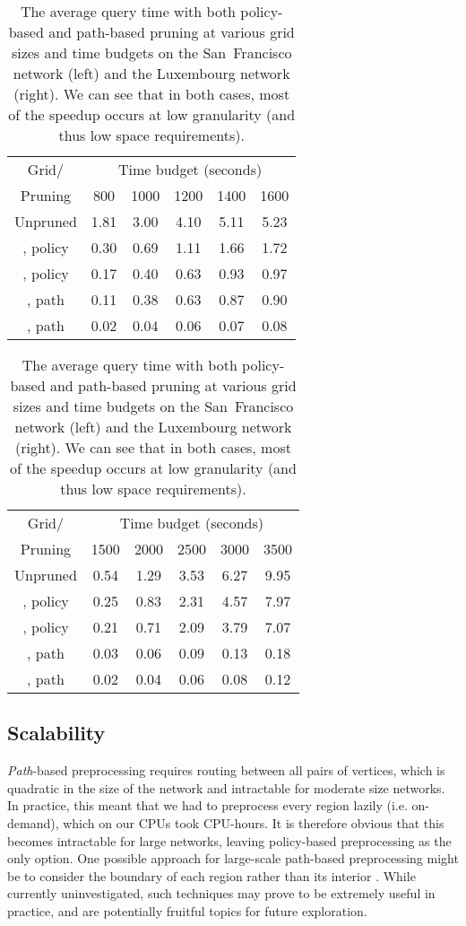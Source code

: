 \documentclass[oribibl]{llncs}
\begin{document}
			\begin{table}[H]
				\centering
				\caption
				{
					The average query time with both policy-based and path-based pruning
					at various grid sizes and time budgets on the San~Francisco network (left)
					and the Luxembourg network (right).
					We can see that in both cases, most of the speedup occurs at low granularity
					(and thus low space requirements).
				}
				\begin{tabular}{|c|c|c|c|c|c|} \noalign{\smallskip}\hline
					Grid/ & \multicolumn{5}{c|}{Time budget (seconds)}  \\\cline{2-6}
					Pruning & 800 & 1000 & 1200 & 1400 & 1600     \\
\hline
					Unpruned        & 1.81 & 3.00 & 4.10 & 5.11 & 5.23  \\ \hline
					, policy & 0.30 & 0.69 & 1.11 & 1.66 & 1.72  \\ \hline
					, policy & 0.17 & 0.40 & 0.63 & 0.93 & 0.97  \\ \hline
					, path   & 0.11 & 0.38 & 0.63 & 0.87 & 0.90  \\ \hline
					, path   & 0.02 & 0.04 & 0.06 & 0.07 & 0.08  \\ \hline
				\end{tabular}
				\begin{tabular}{|c|c|c|c|c|c|} \noalign{\smallskip}\hline
					Grid/ & \multicolumn{5}{c|}{Time budget (seconds)}  \\\cline{2-6}
					Pruning & 1500 & 2000 & 2500 & 3000 & 3500     \\
\hline
					Unpruned        & 0.54 & 1.29 & 3.53 & 6.27 & 9.95  \\ \hline
					, policy & 0.25 & 0.83 & 2.31 & 4.57 & 7.97  \\ \hline
					, policy & 0.21 & 0.71 & 2.09 & 3.79 & 7.07  \\ \hline
					, path   & 0.03 & 0.06 & 0.09 & 0.13 & 0.18  \\ \hline
					, path   & 0.02 & 0.04 & 0.06 & 0.08 & 0.12  \\ \hline
				\end{tabular}
				\label{ref:Policy_Against_Path-ZDC-Table}
			\end{table}

		\subsection{Scalability}\label{sec:scalability}

			\textit{Path}-based preprocessing requires routing between all  pairs of vertices,
			which is quadratic in the size of the network and intractable for moderate size networks.
			In practice, this meant that we had to preprocess every region lazily (i.e. on-demand),
			which on our CPUs took  CPU-hours.
			It is therefore obvious that this becomes intractable for large networks, leaving
			policy-based preprocessing as the only option.
			One possible approach for large-scale path-based preprocessing might be to
			consider the boundary of each region rather than its interior \cite{sabran2014precomputation}.
			While currently uninvestigated, such techniques may prove to be extremely useful in practice,
			and are potentially fruitful topics for future exploration.
\end{document}
